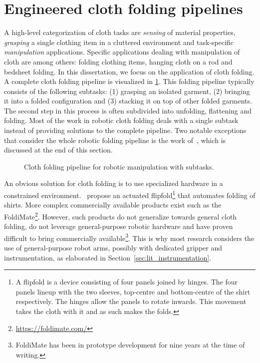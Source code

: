 \section{Engineered cloth folding pipelines} \label{sec:lit_cloth_folding_pipelines}
A high-level categorization of cloth tasks are \emph{sensing} of material properties, \emph{grasping} a single clothing item in a cluttered environment and task-specific \emph{manipulation} applications. Specific applications dealing with manipulation of cloth are among others: folding clothing items, hanging cloth on a rod and bedsheet folding. In this dissertation, we focus on the application of cloth folding. A complete cloth folding pipeline is visualized in \cref{fig:complete_folding_pipeline}. This folding pipeline typically consists of the following subtasks: (1) grasping an isolated garment, (2) bringing it into a folded configuration and (3) stacking it on top of other folded garments. The second step in this process is often subdivided into unfolding, flattening and folding. Most of the work in robotic cloth folding deals with a single subtask instead of providing solutions to the complete pipeline. Two notable exceptions that consider the whole robotic folding pipeline is the work of~\textcite{Doumanoglou2016,Maitin2010}, which is discussed at the end of this section.

\begin{figure}[htbp!]
    \centering
    
    \caption{Cloth folding pipeline for robotic manipulation with subtasks.} 
    \label{fig:complete_folding_pipeline}
\end{figure}

An obvious solution for cloth folding is to use specialized hardware in a constrained environment.~\Textcite{Nair2013} propose an actuated flipfold\footnote{A flipfold is a device consisting of four panels joined by hinges. The four panels lineup with the two sleeves, top-centre and bottom-centre of the shirt respectively. The hinges allow the panels to rotate inwards. This movement takes the cloth with it and as such makes the folds.} that automates folding of shirts. More complex commercially available products exist such as the FoldiMate\textregistered\footnote{\url{https://foldimate.com/}}. However, such products do not generalize towards general cloth folding, do not leverage general-purpose robotic hardware and have proven difficult to bring commercially available\footnote{FoldiMate has been in prototype development for nine years at the time of writing.}. This is why most research considers the use of general-purpose robot arms, possibly with dedicated gripper and instrumentation, as elaborated in Section~\ref{sec:lit_instrumentation}.

